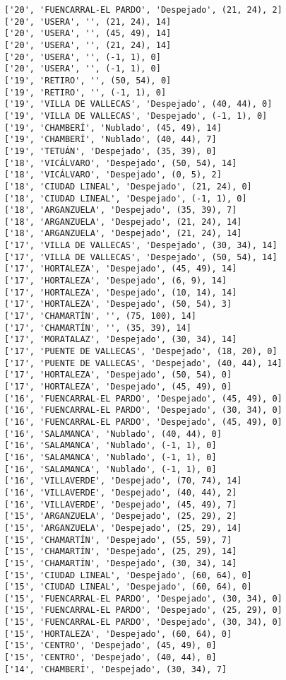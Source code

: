 \documentclass[11pt]{article}
\begin{document}
\begin{Verbatim}[commandchars=\\\{\}]
['20', 'FUENCARRAL-EL PARDO', 'Despejado', (21, 24), 2]
['20', 'USERA', '', (21, 24), 14]
['20', 'USERA', '', (45, 49), 14]
['20', 'USERA', '', (21, 24), 14]
['20', 'USERA', '', (-1, 1), 0]
['20', 'USERA', '', (-1, 1), 0]
['19', 'RETIRO', '', (50, 54), 0]
['19', 'RETIRO', '', (-1, 1), 0]
['19', 'VILLA DE VALLECAS', 'Despejado', (40, 44), 0]
['19', 'VILLA DE VALLECAS', 'Despejado', (-1, 1), 0]
['19', 'CHAMBERÍ', 'Nublado', (45, 49), 14]
['19', 'CHAMBERÍ', 'Nublado', (40, 44), 7]
['19', 'TETUÁN', 'Despejado', (35, 39), 0]
['18', 'VICÁLVARO', 'Despejado', (50, 54), 14]
['18', 'VICÁLVARO', 'Despejado', (0, 5), 2]
['18', 'CIUDAD LINEAL', 'Despejado', (21, 24), 0]
['18', 'CIUDAD LINEAL', 'Despejado', (-1, 1), 0]
['18', 'ARGANZUELA', 'Despejado', (35, 39), 7]
['18', 'ARGANZUELA', 'Despejado', (21, 24), 14]
['18', 'ARGANZUELA', 'Despejado', (21, 24), 14]
['17', 'VILLA DE VALLECAS', 'Despejado', (30, 34), 14]
['17', 'VILLA DE VALLECAS', 'Despejado', (50, 54), 14]
['17', 'HORTALEZA', 'Despejado', (45, 49), 14]
['17', 'HORTALEZA', 'Despejado', (6, 9), 14]
['17', 'HORTALEZA', 'Despejado', (10, 14), 14]
['17', 'HORTALEZA', 'Despejado', (50, 54), 3]
['17', 'CHAMARTÍN', '', (75, 100), 14]
['17', 'CHAMARTÍN', '', (35, 39), 14]
['17', 'MORATALAZ', 'Despejado', (30, 34), 14]
['17', 'PUENTE DE VALLECAS', 'Despejado', (18, 20), 0]
['17', 'PUENTE DE VALLECAS', 'Despejado', (40, 44), 14]
['17', 'HORTALEZA', 'Despejado', (50, 54), 0]
['17', 'HORTALEZA', 'Despejado', (45, 49), 0]
['16', 'FUENCARRAL-EL PARDO', 'Despejado', (45, 49), 0]
['16', 'FUENCARRAL-EL PARDO', 'Despejado', (30, 34), 0]
['16', 'FUENCARRAL-EL PARDO', 'Despejado', (45, 49), 0]
['16', 'SALAMANCA', 'Nublado', (40, 44), 0]
['16', 'SALAMANCA', 'Nublado', (-1, 1), 0]
['16', 'SALAMANCA', 'Nublado', (-1, 1), 0]
['16', 'SALAMANCA', 'Nublado', (-1, 1), 0]
['16', 'VILLAVERDE', 'Despejado', (70, 74), 14]
['16', 'VILLAVERDE', 'Despejado', (40, 44), 2]
['16', 'VILLAVERDE', 'Despejado', (45, 49), 7]
['15', 'ARGANZUELA', 'Despejado', (25, 29), 2]
['15', 'ARGANZUELA', 'Despejado', (25, 29), 14]
['15', 'CHAMARTÍN', 'Despejado', (55, 59), 7]
['15', 'CHAMARTÍN', 'Despejado', (25, 29), 14]
['15', 'CHAMARTÍN', 'Despejado', (30, 34), 14]
['15', 'CIUDAD LINEAL', 'Despejado', (60, 64), 0]
['15', 'CIUDAD LINEAL', 'Despejado', (60, 64), 0]
['15', 'FUENCARRAL-EL PARDO', 'Despejado', (30, 34), 0]
['15', 'FUENCARRAL-EL PARDO', 'Despejado', (25, 29), 0]
['15', 'FUENCARRAL-EL PARDO', 'Despejado', (30, 34), 0]
['15', 'HORTALEZA', 'Despejado', (60, 64), 0]
['15', 'CENTRO', 'Despejado', (45, 49), 0]
['15', 'CENTRO', 'Despejado', (40, 44), 0]
['14', 'CHAMBERÍ', 'Despejado', (30, 34), 7]

\end{Verbatim}
\end{document}
